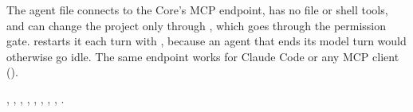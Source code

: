 The agent file  connects to the Core's MCP endpoint, has no file or shell tools, and can change the project only through , which goes through the permission gate.  restarts it each turn with , because an agent that ends its model turn would otherwise go idle. The same endpoint works for Claude Code or any MCP client ().

\begin{wherebox}
, , , , , , , , .
\end{wherebox}

